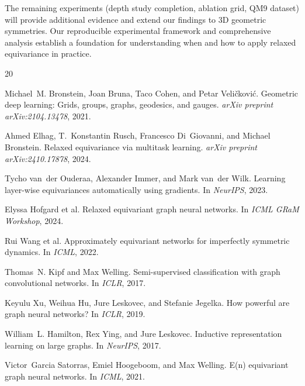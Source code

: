 \documentclass[11pt,a4paper]{article}
\begin{document}
The remaining experiments (depth study completion, ablation grid, QM9 dataset) will provide additional evidence and extend our findings to 3D geometric symmetries. Our reproducible experimental framework and comprehensive analysis establish a foundation for understanding when and how to apply relaxed equivariance in practice.


\begin{thebibliography}{20}

Michael~M. Bronstein, Joan Bruna, Taco Cohen, and Petar Veličković.
\newblock Geometric deep learning: Grids, groups, graphs, geodesics, and gauges.
\newblock \emph{arXiv preprint arXiv:2104.13478}, 2021.

Ahmed Elhag, T.~Konstantin Rusch, Francesco Di~Giovanni, and Michael Bronstein.
\newblock Relaxed equivariance via multitask learning.
\newblock \emph{arXiv preprint arXiv:2410.17878}, 2024.

Tycho van~der Ouderaa, Alexander Immer, and Mark van~der Wilk.
\newblock Learning layer-wise equivariances automatically using gradients.
\newblock In \emph{NeurIPS}, 2023.

Elyssa Hofgard et al.
\newblock Relaxed equivariant graph neural networks.
\newblock In \emph{ICML GRaM Workshop}, 2024.

Rui Wang et al.
\newblock Approximately equivariant networks for imperfectly symmetric dynamics.
\newblock In \emph{ICML}, 2022.

Thomas~N. Kipf and Max Welling.
\newblock Semi-supervised classification with graph convolutional networks.
\newblock In \emph{ICLR}, 2017.

Keyulu Xu, Weihua Hu, Jure Leskovec, and Stefanie Jegelka.
\newblock How powerful are graph neural networks?
\newblock In \emph{ICLR}, 2019.

William~L. Hamilton, Rex Ying, and Jure Leskovec.
\newblock Inductive representation learning on large graphs.
\newblock In \emph{NeurIPS}, 2017.

Victor~Garcia Satorras, Emiel Hoogeboom, and Max Welling.
\newblock E(n) equivariant graph neural networks.
\newblock In \emph{ICML}, 2021.


\end{thebibliography}
\end{document}
